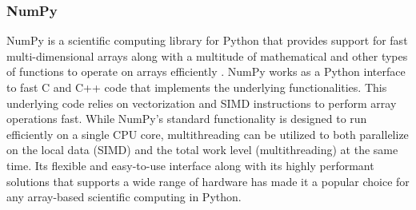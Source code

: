 \subsubsection{NumPy} \label{background:implementation_tools_and_libraries:numpy}
NumPy is a scientific computing library for Python that provides support for fast multi-dimensional arrays along with a multitude of mathematical and other types of functions to operate on arrays efficiently \cite{numpy}.
NumPy works as a Python interface to fast C and C++ code that implements the underlying functionalities.
This underlying code relies on vectorization and SIMD instructions to perform array operations fast. 
While NumPy's standard functionality is designed to run efficiently on a single CPU core, multithreading can be utilized to both parallelize on the local data (SIMD) and the total work level (multithreading) at the same time.
Its flexible and easy-to-use interface along with its highly performant solutions that supports a wide range of hardware has made it a popular choice for any array-based scientific computing in Python.

